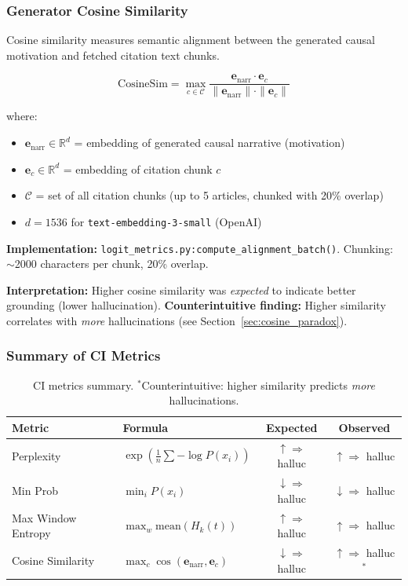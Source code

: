 \subsubsection{Generator Cosine Similarity}

Cosine similarity measures semantic alignment between the generated causal motivation and fetched citation text chunks.

\begin{equation}
\text{CosineSim} = \max_{c \in \mathcal{C}} \frac{\mathbf{e}_{\text{narr}} \cdot \mathbf{e}_c}{\|\mathbf{e}_{\text{narr}}\| \cdot \|\mathbf{e}_c\|}
\label{eq:cosine}
\end{equation}

where:
\begin{itemize}
    \item $\mathbf{e}_{\text{narr}} \in \mathbb{R}^{d}$ = embedding of generated causal narrative (motivation)
    \item $\mathbf{e}_c \in \mathbb{R}^{d}$ = embedding of citation chunk $c$
    \item $\mathcal{C}$ = set of all citation chunks (up to 5 articles, chunked with 20\% overlap)
    \item $d = 1536$ for \texttt{text-embedding-3-small} (OpenAI)
\end{itemize}

\textbf{Implementation:} \texttt{logit\_metrics.py:compute\_alignment\_batch()}. Chunking: $\sim$2000 characters per chunk, 20\% overlap.

\textbf{Interpretation:} Higher cosine similarity was \textit{expected} to indicate better grounding (lower hallucination). \textbf{Counterintuitive finding:} Higher similarity correlates with \textit{more} hallucinations (see Section~\ref{sec:cosine_paradox}).

\subsubsection{Summary of CI Metrics}

\begin{table}[h]
\centering
\begin{tabular}{llcc}
\toprule
\textbf{Metric} & \textbf{Formula} & \textbf{Expected} & \textbf{Observed} \\
\midrule
Perplexity & $\exp\left(\frac{1}{n}\sum -\log P(x_i)\right)$ & $\uparrow \Rightarrow$ halluc & $\uparrow \Rightarrow$ halluc \\
Min Prob & $\min_i P(x_i)$ & $\downarrow \Rightarrow$ halluc & $\downarrow \Rightarrow$ halluc \\
Max Window Entropy & $\max_w \text{mean}(H_k(t))$ & $\uparrow \Rightarrow$ halluc & $\uparrow \Rightarrow$ halluc \\
Cosine Similarity & $\max_c \cos(\mathbf{e}_{\text{narr}}, \mathbf{e}_c)$ & $\downarrow \Rightarrow$ halluc & $\uparrow \Rightarrow$ halluc$^*$ \\
\bottomrule
\end{tabular}
\caption{CI metrics summary. $^*$Counterintuitive: higher similarity predicts \textit{more} hallucinations.}
\label{tab:ci_metrics_summary}
\end{table}


